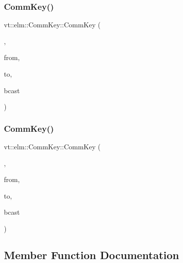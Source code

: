 \subsubsection{\texorpdfstring{Comm\+Key()}{CommKey()}\hspace{0.1cm}{\footnotesize\ttfamily [6/7]}}
{\footnotesize\ttfamily vt\+::elm\+::\+Comm\+Key\+::\+Comm\+Key (\begin{DoxyParamCaption}\item[{\hyperlink{structvt_1_1elm_1_1_comm_key_1_1_collection_to_node_tag}{Collection\+To\+Node\+Tag}}]{,  }\item[{\hyperlink{structvt_1_1elm_1_1_element_i_d_struct}{Element\+I\+D\+Struct}}]{from,  }\item[{\hyperlink{namespacevt_a866da9d0efc19c0a1ce79e9e492f47e2}{Node\+Type}}]{to,  }\item[{bool}]{bcast }\end{DoxyParamCaption})\hspace{0.3cm}{\ttfamily [inline]}}

\mbox{\label{structvt_1_1elm_1_1_comm_key_ac7803fe0fe9642f2f34eb474b61c17da}} 
\subsubsection{\texorpdfstring{Comm\+Key()}{CommKey()}\hspace{0.1cm}{\footnotesize\ttfamily [7/7]}}
{\footnotesize\ttfamily vt\+::elm\+::\+Comm\+Key\+::\+Comm\+Key (\begin{DoxyParamCaption}\item[{\hyperlink{structvt_1_1elm_1_1_comm_key_1_1_node_to_collection_tag}{Node\+To\+Collection\+Tag}}]{,  }\item[{\hyperlink{namespacevt_a866da9d0efc19c0a1ce79e9e492f47e2}{Node\+Type}}]{from,  }\item[{\hyperlink{structvt_1_1elm_1_1_element_i_d_struct}{Element\+I\+D\+Struct}}]{to,  }\item[{bool}]{bcast }\end{DoxyParamCaption})\hspace{0.3cm}{\ttfamily [inline]}}



\subsection{Member Function Documentation}
\mbox{\label{structvt_1_1elm_1_1_comm_key_af456efc0f7900eeca45b130b59de4aed}} 
